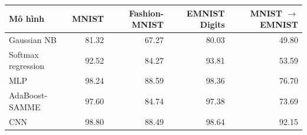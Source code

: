 \begin{tabular}{lrrrr}
\toprule
Mô hình & MNIST & Fashion-MNIST & EMNIST Digits & MNIST $\to$ EMNIST \\
\midrule
Gaussian NB & 81.32 & 67.27 & 80.03 & 49.80 \\
Softmax regression & 92.52 & 84.27 & 93.81 & 53.59 \\
MLP & 98.24 & 88.59 & 98.36 & 76.70 \\
AdaBoost-SAMME & 97.60 & 84.74 & 97.38 & 73.69 \\
CNN & 98.80 & 88.49 & 98.64 & 92.15 \\
\bottomrule
\end{tabular}
